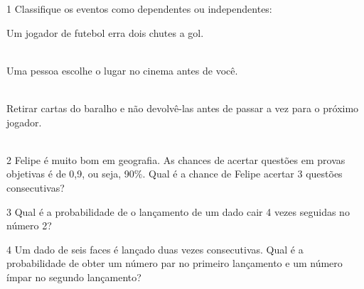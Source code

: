 \num{1} Classifique os eventos como dependentes ou independentes:

\begin{escolha}

\item Um jogador de futebol erra dois chutes a gol.
 \\ \\

\item Uma pessoa escolhe o lugar no cinema antes de você.
 \\ \\

\item Retirar cartas do baralho e não devolvê-las antes de passar a vez para o próximo jogador.
 \\ \\

\end{escolha}

\num{2} Felipe é muito bom em geografia. As chances de acertar questões em
provas objetivas é de 0,9, ou seja, 90\%. Qual é a chance de Felipe
acertar 3 questões consecutivas?


\num{3} Qual é a probabilidade de o lançamento de um dado cair 4 vezes
seguidas no número 2?



\num{4} Um dado de seis faces é lançado duas vezes consecutivas. Qual é a
probabilidade de obter um número par no primeiro lançamento e um número
ímpar no segundo lançamento?

